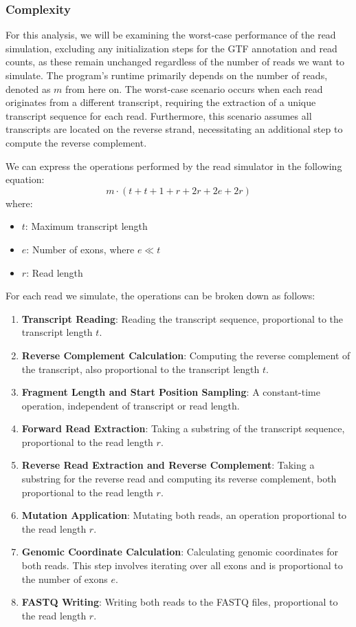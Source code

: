 \documentclass{article}
\begin{document}
    \subsubsection{Complexity}
    For this analysis, we will be examining the worst-case performance of the read simulation, excluding any initialization steps for the GTF annotation and read counts, as these remain unchanged regardless of the number of reads we want to simulate. The program's runtime primarily depends on the number of reads, denoted as \( m \) from here on. The worst-case scenario occurs when each read originates from a different transcript, requiring the extraction of a unique transcript sequence for each read. Furthermore, this scenario assumes all transcripts are located on the reverse strand, necessitating an additional step to compute the reverse complement.

    We can express the operations performed by the read simulator in the following equation:
    \[
        m \cdot (t + t + 1 + r + 2r + 2e + 2r)
    \]
    where:
    \begin{itemize}
        \item \( t \): Maximum transcript length
        \item \( e \): Number of exons, where \( e \ll t \)
        \item \( r \): Read length
    \end{itemize}

    For each read we simulate, the operations can be broken down as follows:

    \begin{enumerate}
        \item \textbf{Transcript Reading}: Reading the transcript sequence, proportional to the transcript length \( t \).
        \item \textbf{Reverse Complement Calculation}: Computing the reverse complement of the transcript, also proportional to the transcript length \( t \).
        \item \textbf{Fragment Length and Start Position Sampling}: A constant-time operation, independent of transcript or read length.
        \item \textbf{Forward Read Extraction}: Taking a substring of the transcript sequence, proportional to the read length \( r \).
        \item \textbf{Reverse Read Extraction and Reverse Complement}: Taking a substring for the reverse read and computing its reverse complement, both proportional to the read length \( r \).
        \item \textbf{Mutation Application}: Mutating both reads, an operation proportional to the read length \( r \).
        \item \textbf{Genomic Coordinate Calculation}: Calculating genomic coordinates for both reads. This step involves iterating over all exons and is proportional to the number of exons \( e \).
        \item \textbf{FASTQ Writing}: Writing both reads to the FASTQ files, proportional to the read length \( r \).
    \end{enumerate}
\end{document}
